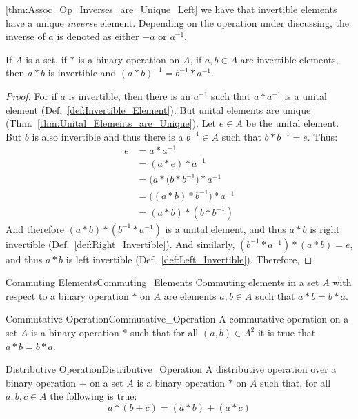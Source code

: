     \ref{thm:Assoc_Op_Inverses_are_Unique_Left} we have that invertible elements
    have a unique \textit{inverse} element. Depending on the operation under
    discussing, the inverse of $a$ is denoted as either $\minus{a}$ or
    $a^{\minus{1}}$.
    \begin{theorem}
        \label{thm:assoc_op_prod_of_inv_is_inv}%
        If $A$ is a set, if $*$ is a binary operation on $A$, if $a,b\in{A}$ are
        invertible elements, then $a*b$ is invertible and
        $(a*b)^{\minus{1}}=b^{\minus{1}}*a^{\minus{1}}$.
    \end{theorem}
    \begin{proof}
        For if $a$ is invertible, then there is an $a^{\minus{1}}$ such that
        $a*a^{\minus{1}}$ is a unital element
        (Def.~\ref{def:Invertible_Element}). But unital elements are unique
        (Thm.~\ref{thm:Unital_Elements_are_Unique}). Let $e\in{A}$ be the unital
        element. But $b$ is also invertible and thus there is a
        $b^{\minus{1}}\in{A}$ such that $b*b^{\minus{1}}=e$. Thus:
        \begin{align}
            e&=a*a^{\minus{1}}
            \tag{Inverse Property}\\
            &=(a*e)*a^{\minus{1}}
            \tag{Identity}\\
            &=\big(a*(b*b^{\minus{1}}\big)*a^{\minus{1}}
            \tag{Inverse Property}\\
            &=\big((a*b)*b^{\minus{1}}\big)*a^{\minus{1}}
            \tag{Associativity}\\
            &=(a*b)*(b*b^{\minus{1}})
            \tag{Associativity}
        \end{align}
        And therefore $(a*b)*(b^{\minus{1}}*a^{\minus{1}})$ is a unital element,
        and thus $a*b$ is right invertible (Def.~\ref{def:Right_Invertible}).
        And similarly, $(b^{\minus{1}}*a^{\minus{1}})*(a*b)=e$, and thus
        $a*b$ is left invertible (Def.~\ref{def:Left_Invertible}). Therefore,
    \end{proof}
    \begin{fdefinition}{Commuting Elements}{Commuting_Elements}
        Commuting elements in a \gls{set} $A$ with respect to a
        \gls{binary operation} $*$ on $A$ are elements $a,b\in{A}$ such that
        $a*b=b*a$.
    \end{fdefinition}
    \begin{fdefinition}{Commutative Operation}{Commutative_Operation}
        A \gls{commutative operation} on a \gls{set} $A$ is a
        \gls{binary operation} $*$ such that for all $(a,b)\in{A}^{2}$ it is
        true that $a*b=b*a$.
    \end{fdefinition}
    \begin{fdefinition}{Distributive Operation}{Distributive_Operation}
        A distributive operation over a \gls{binary operation} $+$ on a
        \gls{set} $A$ is a binary operation $*$ on $A$ such that, for all
        $a,b,c\in{A}$ the following is true:
        \begin{equation*}
            a*(b+c)=(a*b)+(a*c)
        \end{equation*}
    \end{fdefinition}